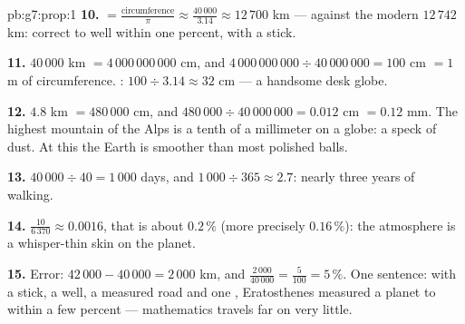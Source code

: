 \begin{solution}{pb:g7:prop:1}
\textbf{10.}  $= \frac{\text{circumference}}{\pi}
\approx \frac{40\,000}{3.14} \approx 12\,700$ km --- against
the modern $12\,742$ km: correct to well within one percent,
with a stick.

\textbf{11.} $40\,000$ km $= 4\,000\,000\,000$ cm, and
$4\,000\,000\,000 \div 40\,000\,000 = 100$ cm $= 1$ m of
circumference. : $100 \div 3.14 \approx 32$ cm --- a
handsome desk globe.

\textbf{12.} $4.8$ km $= 480\,000$ cm, and
$480\,000 \div 40\,000\,000 = 0.012$ cm $= 0.12$ mm. The
highest mountain of the Alps is a tenth of a millimeter on a
 globe: a speck of dust. At this  the Earth is
smoother than most polished balls.

\textbf{13.} $40\,000 \div 40 = 1\,000$ days, and
$1\,000 \div 365 \approx 2.7$: nearly three years of walking.

\textbf{14.} $\frac{10}{6\,370} \approx 0.0016$, that is about
$0.2\,\%$ (more precisely $0.16\,\%$): the atmosphere is a
whisper-thin skin on the planet.

\textbf{15.} Error: $42\,000 - 40\,000 = 2\,000$ km, and
$\frac{2\,000}{40\,000} = \frac{5}{100} = 5\,\%$. One sentence:
with a stick, a well, a measured road and one ,
Eratosthenes measured a planet to within a few percent ---
mathematics travels far on very little.
\end{solution}
